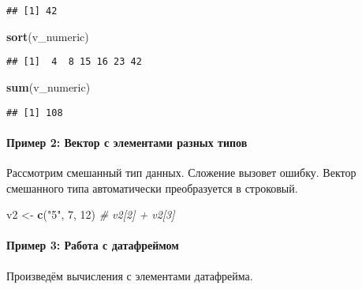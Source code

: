 \documentclass[
]{article}
\newenvironment{Shaded}{\begin{snugshade}}{\end{snugshade}}
\newcommand{\CommentTok}[1]{\textcolor[rgb]{0.56,0.35,0.01}{\textit{#1}}}
\newcommand{\DecValTok}[1]{\textcolor[rgb]{0.00,0.00,0.81}{#1}}
\newcommand{\FunctionTok}[1]{\textcolor[rgb]{0.13,0.29,0.53}{\textbf{#1}}}
\newcommand{\NormalTok}[1]{#1}
\newcommand{\OtherTok}[1]{\textcolor[rgb]{0.56,0.35,0.01}{#1}}
\newcommand{\StringTok}[1]{\textcolor[rgb]{0.31,0.60,0.02}{#1}}
\begin{document}
\begin{verbatim}
## [1] 42
\end{verbatim}

\begin{Shaded}
\begin{Highlighting}[]
\FunctionTok{sort}\NormalTok{(v\_numeric)}
\end{Highlighting}
\end{Shaded}

\begin{verbatim}
## [1]  4  8 15 16 23 42
\end{verbatim}

\begin{Shaded}
\begin{Highlighting}[]
\FunctionTok{sum}\NormalTok{(v\_numeric)}
\end{Highlighting}
\end{Shaded}

\begin{verbatim}
## [1] 108
\end{verbatim}

\paragraph{Пример 2: Вектор с элементами разных
типов}\label{ux43fux440ux438ux43cux435ux440-2-ux432ux435ux43aux442ux43eux440-ux441-ux44dux43bux435ux43cux435ux43dux442ux430ux43cux438-ux440ux430ux437ux43dux44bux445-ux442ux438ux43fux43eux432}

Рассмотрим смешанный тип данных. Сложение вызовет ошибку. Вектор
смешанного типа автоматически преобразуется в строковый.

\begin{Shaded}
\begin{Highlighting}[]
\NormalTok{v2 }\OtherTok{\textless{}{-}} \FunctionTok{c}\NormalTok{(}\StringTok{"5"}\NormalTok{, }\DecValTok{7}\NormalTok{, }\DecValTok{12}\NormalTok{)}
\CommentTok{\# v2[2] + v2[3]}
\end{Highlighting}
\end{Shaded}

\paragraph{Пример 3: Работа с
датафреймом}\label{ux43fux440ux438ux43cux435ux440-3-ux440ux430ux431ux43eux442ux430-ux441-ux434ux430ux442ux430ux444ux440ux435ux439ux43cux43eux43c}

Произведём вычисления с элементами датафрейма.
\end{document}
